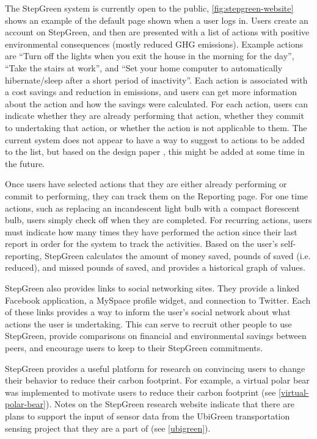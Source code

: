 The StepGreen system is currently open to the public, \autoref{fig:stepgreen-website} shows an example of the default page shown when a user logs in. Users create an account on StepGreen, and then are presented with a list of actions with positive environmental consequences (mostly reduced GHG emissions). Example actions are ``Turn off the lights when you exit the house in the morning for the day'', ``Take the stairs at work'', and ``Set your home computer to automatically hibernate/sleep after a short period of inactivity''. Each action is associated with a cost savings and reduction in \COtwo emissions, and users can get more information about the action and how the savings were calculated. For each action, users can indicate whether they are already performing that action, whether they commit to undertaking that action, or whether the action is not applicable to them. The current system does not appear to have a way to suggest to actions to be added to the list, but based on the design paper \cite{Mankoff2007Leveraging-Soci}, this might be added at some time in the future.

Once users have selected actions that they are either already performing or commit to performing, they can track them on the Reporting page. For one time actions, such as replacing an incandescent light bulb with a compact florescent bulb, users simply check off when they are completed. For recurring actions, users must indicate how many times they have performed the action since their last report in order for the system to track the activities. Based on the user's self-reporting, StepGreen calculates the amount of money saved, pounds of \COtwo saved (i.e. reduced), and missed pounds of \COtwo saved, and provides a historical graph of values.

StepGreen also provides links to social networking sites. They provide a linked Facebook application, a MySpace profile widget, and connection to Twitter. Each of these links provides a way to inform the user's social network about what actions the user is undertaking. This can serve to recruit other people to use StepGreen, provide comparisons on financial and environmental savings between peers, and encourage users to keep to their StepGreen commitments. 

StepGreen provides a useful platform for research on convincing users to change their behavior to reduce their carbon footprint. For example, a virtual polar bear was implemented to motivate users to reduce their carbon footprint (see \autoref{virtual-polar-bear}). Notes on the StepGreen research website \cite{stepgreen-research-website} indicate that there are plans to support the input of sensor data from the UbiGreen transportation sensing project that they are a part of (see \autoref{ubigreen}).

